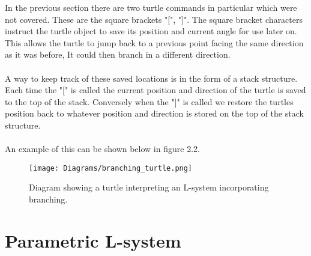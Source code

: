 In the previous section there are two turtle commands in particular which were not covered. These are the square brackets "[", "]". The square bracket characters instruct the turtle object to save its position and current angle for use later on. This allows the turtle to jump back to a previous point facing the same direction as it was before, It could then branch in a different direction.\\
\\
A way to keep track of these saved locations is in the form of a stack structure. Each time the "[" is called the current position and direction of the turtle is saved to the top of the stack. Conversely when the "]" is called we restore the turtles position back to whatever position and direction is stored on the top of the stack structure. \\
\\
An example of this can be shown below in figure 2.2.\\

\begin{figure}[htbp]
	{\centering
		\vspace{7px}
		\texttt{[image: Diagrams/branching\_turtle.png]}
		\caption{Diagram showing a turtle interpreting an L-system incorporating branching.}
	}
\end{figure}
\FloatBarrier

\section{Parametric L-system}

